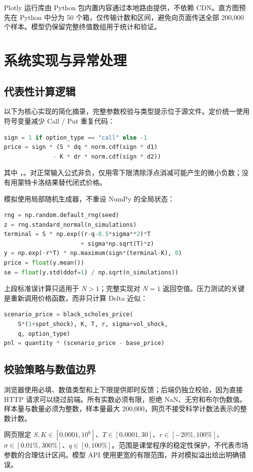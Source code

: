\documentclass[UTF8,a4paper,12pt]{ctexart}
\begin{document}
Plotly 运行库由 Python 包内置内容通过本地路由提供，不依赖 CDN。直方图预先在 Python 中分为 50 个箱，仅传输计数和区间，避免向页面传送全部 200,000 个样本。模型仍保留完整终值数组用于统计和验证。
\newpage

\section{系统实现与异常处理}
\subsection{代表性计算逻辑}
以下为核心实现的简化摘录，完整参数校验与类型提示位于源文件。定价统一使用符号变量减少 Call / Put 重复代码：
\begin{lstlisting}[language=Python]
sign = 1 if option_type == "call" else -1
price = sign * (S * dq * norm.cdf(sign * d1)
              - K * dr * norm.cdf(sign * d2))
\end{lstlisting}
其中 ，。对正常输入公式非负，仅用零下限清除浮点消减可能产生的微小负数；没有用蒙特卡洛结果替代闭式价格。

模拟使用局部随机生成器，不重设 NumPy 的全局状态：
\begin{lstlisting}[language=Python]
rng = np.random.default_rng(seed)
z = rng.standard_normal(n_simulations)
terminal = S * np.exp((r-q-0.5*sigma**2)*T
                      + sigma*np.sqrt(T)*z)
y = np.exp(-r*T) * np.maximum(sign*(terminal-K), 0)
price = float(y.mean())
se = float(y.std(ddof=1) / np.sqrt(n_simulations))
\end{lstlisting}
上段标准误计算只适用于 $N>1$；完整实现对 $N=1$ 返回空值。压力测试的关键是重新调用价格函数，而非只计算 Delta 近似：
\begin{lstlisting}[language=Python]
scenario_price = black_scholes_price(
    S*(1+spot_shock), K, T, r, sigma+vol_shock,
    q, option_type)
pnl = quantity * (scenario_price - base_price)
\end{lstlisting}

\subsection{校验策略与数值边界}
浏览器使用必填、数值类型和上下限提供即时反馈；后端仍独立校验，因为直接 HTTP 请求可以绕过前端。所有实数必须有限，拒绝 NaN、无穷和布尔伪数值。样本量与数量必须为整数，样本量最大 200,000，网页不接受科学计数法表示的整数计数。

网页限定 $S,K\in[0.0001,10^6]$、$T\in[0.0001,30]$、$r\in[-20\%,100\%]$、$\sigma\in[0.01\%,300\%]$、$q\in[0,100\%]$。范围是课堂程序的稳定性保护，不代表市场参数的合理估计区间。模型 API 使用更宽的有限范围，并对模拟溢出给出明确错误。
\end{document}
